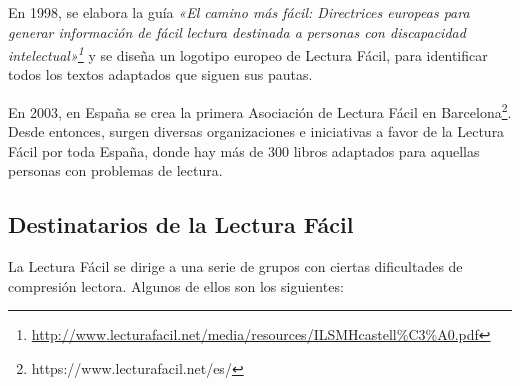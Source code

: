  \setlength{\parskip}{10pt}

En 1998, se elabora la guía \textit{«El camino más fácil: Directrices europeas para generar información de fácil lectura destinada a personas con discapacidad intelectual»\footnote{\href{http://www.lecturafacil.net/media/resources/ILSMHcastell\%C3\%A0.pdf}{http://www.lecturafacil.net/media/resources/ILSMHcastell\%C3\%A0.pdf}}} y se diseña un logotipo europeo de Lectura Fácil, para identificar todos los textos adaptados que siguen sus pautas.

 \setlength{\parskip}{10pt}
 
En 2003, en España se crea la primera Asociación de Lectura Fácil en Barcelona\footnote{https://www.lecturafacil.net/es/}. Desde entonces, surgen diversas organizaciones e iniciativas a favor de la Lectura Fácil por toda España, donde hay más de 300 libros adaptados para aquellas personas con problemas de lectura.


\subsection{Destinatarios de la Lectura Fácil}
La Lectura Fácil se dirige a una serie de grupos con ciertas dificultades de compresión lectora. Algunos de ellos son los siguientes: 
 
